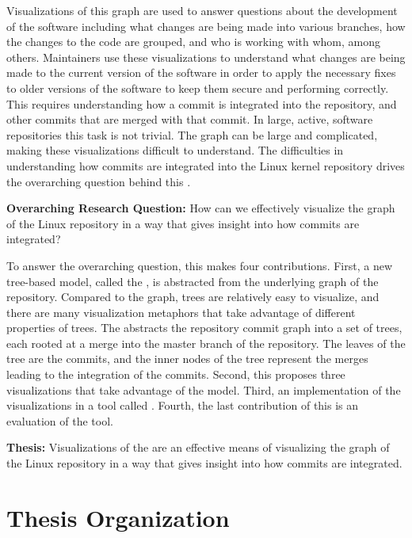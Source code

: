Visualizations of this graph are used to answer questions about the
development of the software including what changes are being made into
various branches, how the changes to the code are grouped, and who is
working with whom, among others. Maintainers use these visualizations to
understand what changes are being made to the current version of the
software in order to apply the necessary fixes to older versions of the
software to keep them secure and performing correctly. This requires
understanding how a commit is integrated into the repository, and other
commits that are merged with that commit. In large, active, software
repositories this task is not trivial.
The graph can be large and
complicated, making these visualizations difficult to understand.
The difficulties in understanding how commits are integrated into the
Linux kernel repository drives the overarching question behind this
\paper{}.

\begin{textbox}
  \textbf{Overarching Research Question:} How can we effectively
  visualize the graph of the Linux repository in a way that gives
  insight into how commits are integrated?
\end{textbox}

To answer the overarching question, this \paper{} makes four
contributions.
First, a new tree-based model, called the \mt{},
is abstracted from the underlying graph of the repository.
Compared to the graph, trees are relatively easy to visualize, and there are many visualization metaphors that take advantage of different properties of trees.
The \mt{} abstracts the repository commit graph into a set of trees, each rooted at a merge into the master branch of the repository.
The leaves of the tree are the commits, and the inner nodes of the tree represent the merges leading to the integration of the commits.
Second, this \paper{} proposes three visualizations that take advantage of the \mt{} model.
Third, an implementation of the visualizations in a tool called \tool{}.
Fourth, the last contribution of this \paper{} is an evaluation of the
tool.

\begin{textbox}
  \textbf{Thesis:} Visualizations of the \mt{} are an effective means of
  visualizing the graph of the Linux repository in a way that gives
  insight into how commits are integrated.
\end{textbox}

\section{Thesis Organization}\label{sec:thesis_organization}

